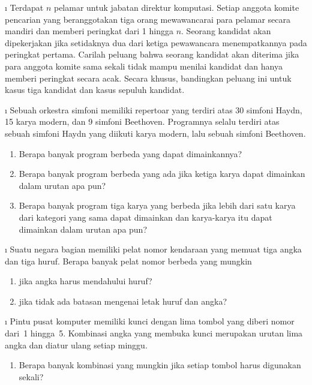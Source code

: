 \begin{LJSItem}
\i\label{exer 3.1.11} Terdapat $n$ pelamar untuk jabatan direktur komputasi.  Setiap
anggota komite pencarian yang beranggotakan tiga orang mewawancarai para pelamar secara
mandiri dan memberi peringkat dari 1 hingga $n$.  Seorang kandidat akan dipekerjakan
jika setidaknya dua dari ketiga pewawancara menempatkannya pada peringkat pertama.
Carilah peluang bahwa seorang kandidat akan diterima jika para anggota komite sama
sekali tidak mampu menilai kandidat dan hanya memberi peringkat secara acak.  Secara
khusus, bandingkan peluang ini untuk kasus tiga kandidat dan kasus sepuluh kandidat.

\i\label{exer 3.1.12} Sebuah orkestra simfoni memiliki repertoar yang terdiri atas 30
simfoni Haydn, 15 karya modern, dan 9 simfoni Beethoven.  Programnya selalu terdiri
atas sebuah simfoni Haydn yang diikuti karya modern, lalu sebuah simfoni Beethoven.

\begin{enumerate}
\item Berapa banyak program berbeda yang dapat dimainkannya?

\item Berapa banyak program berbeda yang ada jika ketiga karya dapat dimainkan dalam
urutan apa pun?

\item Berapa banyak program tiga karya yang berbeda jika lebih dari satu karya dari
kategori yang sama dapat dimainkan dan karya-karya itu dapat dimainkan dalam urutan
apa pun?
\end{enumerate}

\i\label{exer 3.1.13} Suatu negara bagian memiliki pelat nomor kendaraan yang memuat
tiga angka dan tiga huruf.  Berapa banyak pelat nomor berbeda yang mungkin

\begin{enumerate}
\item jika angka harus mendahului huruf?

\item jika tidak ada batasan mengenai letak huruf dan angka?
\end{enumerate}

\i\label{exer 3.1.14} Pintu pusat komputer memiliki kunci dengan lima tombol yang
diberi nomor dari~1 hingga~5.  Kombinasi angka yang membuka kunci merupakan urutan
lima angka dan diatur ulang setiap minggu.

\begin{enumerate}
\item Berapa banyak kombinasi yang mungkin jika setiap tombol harus digunakan sekali?


\end{enumerate}
\end{LJSItem}
